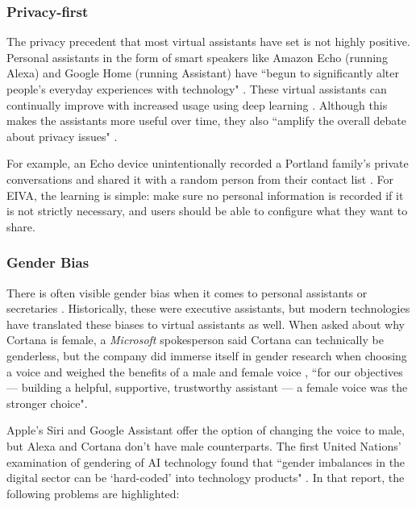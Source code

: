 \documentclass{article}
\begin{document}
\subsubsection{Privacy-first}

The privacy precedent that most virtual assistants have set is not highly positive. Personal assistants in the form of smart speakers like Amazon Echo (running Alexa) and Google Home (running Assistant) have ``begun to significantly alter people’s everyday experiences with technology" \cite{pridmore_personal_2020}. These virtual assistants can continually improve with increased usage using deep learning \cite{kepuska_next-generation_2018}. Although this makes the assistants more useful over time, they also ``amplify the overall debate about privacy issues" \cite{zeng_end_2017}.

For example, an Echo device unintentionally recorded a Portland family's private conversations and shared it with a random person from their contact list \cite{noauthor_this_nodate-1}. For EIVA, the learning is simple: make sure no personal information is recorded if it is not strictly necessary, and users should be able to configure what they want to share.

\subsubsection{Gender Bias}

There is often visible gender bias when it comes to personal assistants or secretaries \cite{noauthor_why_2018}. Historically, these were executive assistants, but modern technologies have translated these biases to virtual assistants as well. When asked about why Cortana is female, a \emph{Microsoft} spokesperson said Cortana can technically be genderless, but the company did immerse itself in gender research when choosing a voice and weighed the benefits of a male and female voice \cite{pcmag_real_2018}, ``for our objectives — building a helpful, supportive, trustworthy assistant — a female voice was the stronger choice".

Apple's Siri and Google Assistant offer the option of changing the voice to male, but Alexa and Cortana don't have male counterparts. The first United Nations' examination of gendering of AI technology found that ``gender imbalances in the digital sector can be `hard-coded' into technology products" \cite{noauthor_id_nodate}. In that report, the following problems are highlighted:
\end{document}
